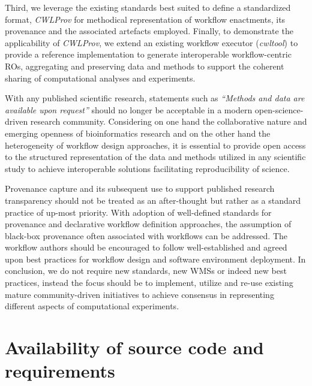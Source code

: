 \documentclass[a4paper,num-refs]{oup-contemporary}
\begin{document}
Third, we leverage the existing standards best suited to define a standardized format, \textit{CWLProv} for methodical representation of workflow enactments, its provenance and the associated artefacts employed. Finally, to demonstrate the applicability of \textit{CWLProv}, we extend an existing workflow executor (\textit{cwltool}) to provide a reference implementation to generate interoperable workflow-centric ROs, aggregating and preserving data and methods to support the coherent sharing of computational analyses and experiments. 

With any published scientific research, statements such as \textit{``Methods and data are available upon request''} should no longer be acceptable in a modern open-science-driven research community. Considering on one hand the collaborative nature and emerging openness of bioinformatics research and on the other hand the heterogeneity of workflow design approaches, it is essential to provide open access to the structured representation of the data and methods utilized in any scientific study to achieve interoperable solutions facilitating reproducibility of science. 

Provenance capture and its subsequent use to support published research transparency should not be treated as an after-thought but rather as a standard practice of up-most priority. With adoption of well-defined standards for provenance and declarative workflow definition approaches, the assumption of black-box provenance often associated with workflows can be addressed. The workflow authors should be encouraged to follow well-established and agreed upon best practices for workflow design and software environment deployment. In conclusion, we do not require new standards, new WMSs or indeed new best practices, instead the focus should be to implement, utilize and re-use existing mature community-driven initiatives to achieve consensus in representing different aspects of computational experiments. 

\section{Availability of source code and requirements}
\end{document}
